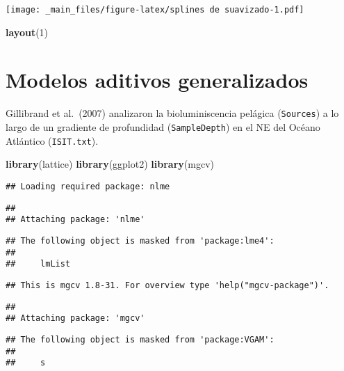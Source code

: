 \documentclass[
]{book}
\newenvironment{Shaded}{\begin{snugshade}}{\end{snugshade}}
\newcommand{\DecValTok}[1]{\textcolor[rgb]{0.00,0.00,0.81}{#1}}
\newcommand{\KeywordTok}[1]{\textcolor[rgb]{0.13,0.29,0.53}{\textbf{#1}}}
\newcommand{\NormalTok}[1]{#1}
\begin{document}
\texttt{[image: \_main\_files/figure-latex/splines de suavizado-1.pdf]}

\begin{Shaded}
\begin{Highlighting}[]
\KeywordTok{layout}\NormalTok{(}\DecValTok{1}\NormalTok{)}
\end{Highlighting}
\end{Shaded}

\hypertarget{modelos-aditivos-generalizados}{%
\section{Modelos aditivos generalizados}\label{modelos-aditivos-generalizados}}

Gillibrand et al.~(2007) analizaron la bioluminiscencia pelágica (\texttt{Sources}) a lo largo de un gradiente de profundidad (\texttt{SampleDepth}) en el NE del Océano Atlántico (\texttt{ISIT.txt}).

\begin{Shaded}
\begin{Highlighting}[]
\KeywordTok{library}\NormalTok{(lattice)}
\KeywordTok{library}\NormalTok{(ggplot2)}
\KeywordTok{library}\NormalTok{(mgcv)}
\end{Highlighting}
\end{Shaded}

\begin{verbatim}
## Loading required package: nlme
\end{verbatim}

\begin{verbatim}
## 
## Attaching package: 'nlme'
\end{verbatim}

\begin{verbatim}
## The following object is masked from 'package:lme4':
## 
##     lmList
\end{verbatim}

\begin{verbatim}
## This is mgcv 1.8-31. For overview type 'help("mgcv-package")'.
\end{verbatim}

\begin{verbatim}
## 
## Attaching package: 'mgcv'
\end{verbatim}

\begin{verbatim}
## The following object is masked from 'package:VGAM':
## 
##     s
\end{verbatim}
\end{document}

